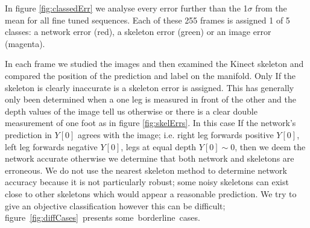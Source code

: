 \documentclass[11pt]{article} %
\begin{document}
In figure \ref{fig:classedErr} we analyse every error further than the 1$\sigma$ from the mean for all fine tuned sequences. Each of these 255 frames is assigned 1 of 5 classes: a network error (red), a skeleton error (green) or an image error (magenta).

In each frame we studied the images and then examined the Kinect skeleton and compared the position of the prediction and label on the manifold. Only If the skeleton is clearly inaccurate is a skeleton error is assigned. This has generally only been determined when a one leg is measured in front of the other and the depth values of the image tell us otherwise or there is a clear double measurement of one foot as in figure \ref{fig:skelErrs}. In this case If the network's prediction in $Y[0]$ agrees with the image; i.e. right leg forwards positive $Y[0]$,  left leg forwards negative $Y[0]$, legs at equal depth $Y[0]\sim 0$, then we deem the network accurate otherwise we determine that both network and skeletons are erroneous. We do not use the nearest skeleton method to determine network accuracy because it is not particularly robust; some noisy skeletons can exist close to other skeletons which would appear a reasonable prediction. We try to give an objective classification however this can be difficult; figure~\ref{fig:diffCases}~presents some~borderline~cases. 
\end{document}
